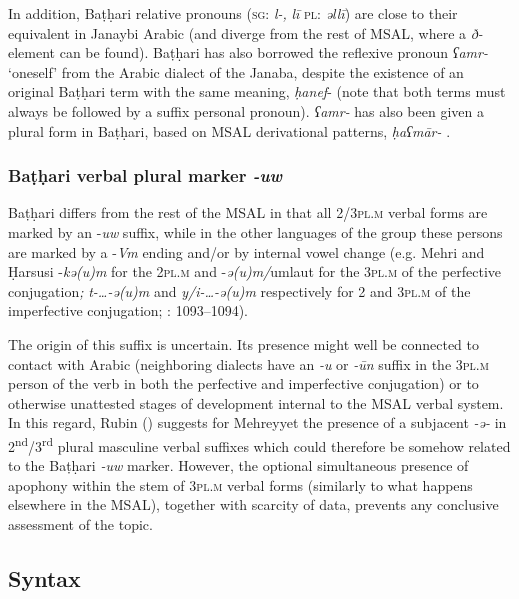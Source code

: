 \documentclass[output=paper]{langsci/langscibook}
\begin{document}
In addition, Baṭḥari relative pronouns (\textsc{sg}: \textit{l-,} \textit{lī} \textsc{pl}: \textit{əllī}) are close to their equivalent in Janaybi Arabic (and diverge from the rest of MSAL, where a \textit{ð-} element can be found). Baṭḥari has also borrowed the reflexive pronoun \textit{ʕamr-} ‘oneself’ from the Arabic dialect of the Janaba, despite the existence of an original Baṭḥari term with the same meaning, \textit{ḥanef}{}- (note that both terms must always be followed by a suffix personal pronoun). \textit{ʕamr-} has also been given a plural form in Baṭḥari, based on MSAL derivational patterns, \textit{ḥaʕmār-} \citep[14]{Morris2017}.


 \subsubsection{Baṭḥari verbal plural marker \textit{{}-uw}} 

Baṭḥari differs from the rest of the MSAL in that all 2/\textsc{3pl.m} verbal forms are marked by an -\textit{uw} suffix, while in the other languages of the group these persons are marked by a -\textit{Vm} ending and/or by internal vowel change (e.g. Mehri and Ḥarsusi -\textit{kə(u)m} for the \textsc{2pl.m} and -\textit{ə(u)m/}umlaut for the \textsc{3pl.m} of the perfective conjugation\textit{;} \textit{t-…-ə(u)m} and \textit{y/i-…-ə(u)m} respectively for 2 and \textsc{3pl.m} of the imperfective conjugation; \citealt{Simeone-Senelle2011}: 1093--1094). 

The origin of this suffix is uncertain. Its presence might well be connected to contact with Arabic (neighboring dialects have an \textit{{}-u} or \textit{{}-}\textit{ūn} suffix in the \textsc{3pl.m} person of the verb in both the perfective and imperfective conjugation) or to otherwise unattested stages of development internal to the MSAL verbal system. In this regard, Rubin (\citeyear[5]{Rubin2017}) suggests for {Mehreyyet} the presence of a subjacent \textit{{}-ə{}-} in 2\textsuperscript{nd}/3\textsuperscript{rd} plural masculine verbal suffixes which could therefore be somehow related to the Baṭḥari \textit{{}-uw} marker. However, the optional simultaneous presence of apophony within the stem of \textsc{3pl.m} verbal forms (similarly to what happens elsewhere in the MSAL), together with scarcity of data, prevents any conclusive assessment of the topic.


 
 \subsection{Syntax}\label{sec:key:syn}
\end{document}
